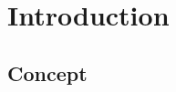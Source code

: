 
\chapter{Introduction} %
\label{sec:intro}

\label{Chapter1} %


\newcommand{\keyword}[1]{\textbf{#1}}
\newcommand{\tabhead}[1]{\textbf{#1}}
\newcommand{\code}[1]{\texttt{#1}}
\newcommand{\file}[1]{\texttt{\bfseries#1}}
\newcommand{\option}[1]{\texttt{\itshape#1}}


\section{Concept}

